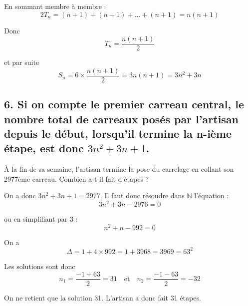 \documentclass[10pt]{article}
\begin{document}
	En sommant membre à membre :
	\[
	2T_n = (n+1) + (n+1) + \dots + (n+1) = n(n+1)
	\]
	
	Donc
	\[
	T_n = \dfrac{n(n+1)}{2}
	\]
	
	et par suite
	\[
	S_n = 6 \times \dfrac{n(n+1)}{2} = 3n(n+1) = 3n^2 + 3n
	\]
	
	\subsection*{6. Si on compte le premier carreau central, le nombre total de carreaux posés par l’artisan depuis le début, lorsqu’il termine la n-ième étape, est donc $3n^2 + 3n + 1$.}
	
	À la fin de sa semaine, l’artisan termine la pose du carrelage en collant son 2977ème carreau. Combien a-t-il fait d’étapes ?
	
	On a donc $3n^2 + 3n + 1 = 2977$. Il faut donc résoudre dans $\mathbb{N}$ l’équation :
	\[
	3n^2 + 3n - 2976 = 0
	\]
	
	ou en simplifiant par 3 :
	\[
	n^2 + n - 992 = 0
	\]
	
	On a
	\[
	\Delta = 1 + 4 \times 992 = 1 + 3968 = 3969 = 63^2
	\]
	
	Les solutions sont donc
	\[
	n_1 = \dfrac{-1 + 63}{2} = 31 \quad \text{et} \quad n_2 = \dfrac{-1 - 63}{2} = -32
	\]
	
	On ne retient que la solution 31. L’artisan a donc fait 31 étapes.
\end{document}
